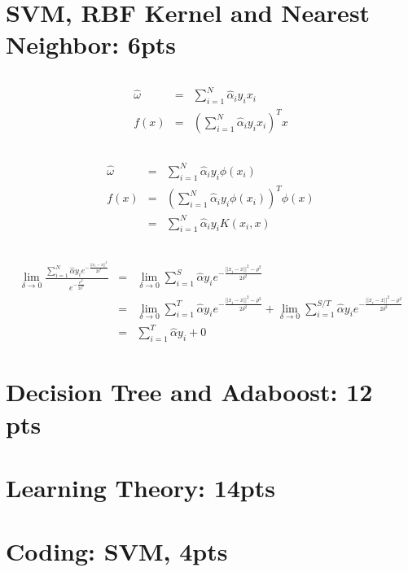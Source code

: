 \documentclass[12pt]{article}
\begin{document}
\section{SVM, RBF Kernel and Nearest Neighbor: 6pts}
\subsection{}
\begin{eqnarray}
    \hat{\omega} &=& \sum_{i=1}^N \hat{\alpha}_iy_ix_i \nonumber\\
    f(x) &=& (\sum_{i=1}^N \hat{\alpha}_iy_ix_i)^T x \nonumber
\end{eqnarray}

\subsection{}
\begin{eqnarray}
    \hat{\omega} &=& \sum_{i=1}^N \hat{\alpha}_iy_i\phi(x_i) \nonumber \\
    f(x) &=& (\sum_{i=1}^N \hat{\alpha}_iy_i\phi(x_i))^T \phi(x) \nonumber \\ 
        &=& \sum_{i=1}^N \hat{\alpha}_iy_iK(x_i, x) \nonumber
\end{eqnarray}

\subsection{}
\begin{eqnarray}
    \lim_{\delta \to 0} \frac{\sum_{i=1}^{N}{\hat{\alpha}y_ie^{-\frac{||x_i-x||^{2}}{2\delta^{2}}}}}{e^{-\frac{\rho ^2}{2\delta^{2}}}}
    &=& \lim_{\delta \to 0} \sum_{i=1}^{S}{\hat{\alpha}y_ie^{-\frac{||x_i-x||^{2} - \rho ^2}{2\delta^{2}}}} \nonumber \\
    &=& \lim_{\delta \to 0} \sum_{i=1}^{T}{\hat{\alpha}y_ie^{-\frac{||x_i - x||^{2} - \rho^2}{2\delta^2}}} 
    +  \lim_{\delta \to 0} \sum_{i=1}^{S/T}{\hat{\alpha}y_ie^{-\frac{||x_i - x||^{2} - \rho^2}{2\delta^2}}} \nonumber \\
    &=& \sum_{i=1}^{T}{\hat{\alpha}y_i + 0} \nonumber 
\end{eqnarray}

\newpage

\section{Decision Tree and Adaboost: 12 pts}

\newpage

\section{Learning Theory: 14pts}

\newpage

\section{Coding: SVM, 4pts}
\end{document}
